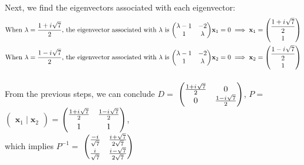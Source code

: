 \documentclass{article}
\newcommand{\iu}{{i\mkern1mu}}
\begin{document}
        \paragraph{}
        	Next, we find the eigenvectors associated with each eigenvector:
            \begin{align*}
            	\text{When } \lambda = \frac{1 + \iu\sqrt{7}}{2} \text{, the eigenvector associated with } \lambda \text{ is }
                \text{\(\begin{pmatrix}\lambda - 1 & -2\\1 & \lambda\end{pmatrix}\)}\textbf{x}_1 = 0 \implies \textbf{x}_1 = 
                \text{\(\begin{pmatrix}\frac{1 + \iu\sqrt{7}}{2}\\[6pt]1\end{pmatrix}\)}\\
                \text{When } \lambda = \frac{1 - \iu\sqrt{7}}{2} \text{, the eigenvector associated with } \lambda \text{ is }
                \text{\(\begin{pmatrix}\lambda - 1 & -2\\1 & \lambda\end{pmatrix}\)}\textbf{x}_2 = 0 \implies \textbf{x}_2 = 
                \text{\(\begin{pmatrix}\frac{1 - \iu\sqrt{7}}{2}\\[6pt]1\end{pmatrix}\)}\\
            \end{align*}
        \paragraph{}
        	From the previous steps, 
            	we can conclude 
                	$D = $ \(\begin{pmatrix}\frac{1 + \iu\sqrt{7}}{2} & 0\\0 & \frac{1 - \iu\sqrt{7}}{2}\end{pmatrix}\),
                    $P = $ \(\begin{pmatrix}\textbf{x}_1 \mid \textbf{x}_2 \end{pmatrix}\) = 
                    	   \(\begin{pmatrix}\frac{1 + \iu\sqrt{7}}{2} & \frac{1 - \iu\sqrt{7}}{2}\\[3pt] 1 & 1\end{pmatrix}\),\\ which implies 
                    $P^{-1} = $ \(\begin{pmatrix}\frac{-\iu}{\sqrt{7}} & \frac{\iu + \sqrt{7}}{2\sqrt{7}} \\[3pt] \frac{\iu}{\sqrt{7}} & \frac{\iu - \sqrt{7}}{2\sqrt{7}}\end{pmatrix}\)\\
                    
\end{document}
